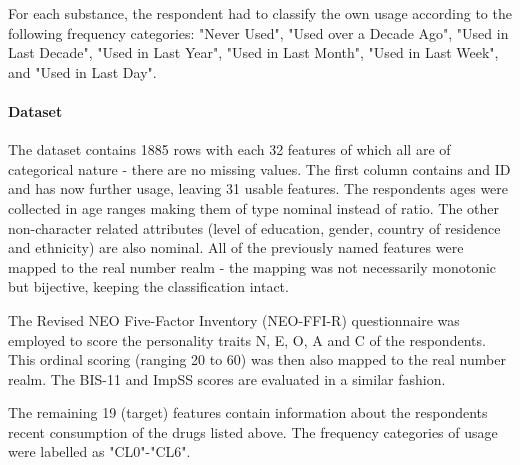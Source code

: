 \documentclass{article}
\begin{document}
For each substance, the respondent had to classify the own usage according to the following frequency categories: "Never Used", "Used over a Decade Ago", "Used in Last Decade", "Used in Last Year", "Used in Last Month", "Used in Last Week", and "Used in Last Day".



\paragraph{Dataset}

\noindent The dataset contains 1885 rows with each 32 features of which all are of categorical nature - there are no missing values. The first column contains and ID and has now further usage, leaving 31 usable features. The respondents ages were collected in age ranges making them of type nominal instead of ratio. The other non-character related attributes (level of education, gender, country of residence and ethnicity) are also nominal. All of the previously named features were mapped to the real number realm - the mapping was not necessarily monotonic but bijective, keeping the classification intact.

The Revised NEO Five-Factor Inventory (NEO-FFI-R) questionnaire was employed to score the personality traits N, E, O, A and C of the respondents. This ordinal scoring (ranging 20 to 60) was then also mapped to the real number realm. The BIS-11 and ImpSS scores are evaluated in a similar fashion.

The remaining 19 (target) features contain information about the respondents recent consumption of the drugs listed above. The frequency categories of usage were labelled as "CL0"-"CL6". 
\end{document}
